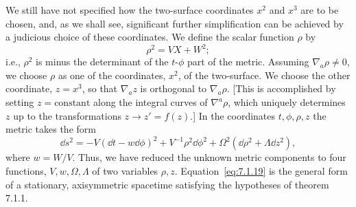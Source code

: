 We still have not specified how the two-surface coordinates \(x^2\) and \(x^3\) are
to be chosen, and, as we shall see, significant further simplification can be achieved
by a judicious choice of these coordinates. We define the scalar function \(\rho\) by
\begin{equation}
  \rho^2=VX+W^2 ;
  \tag{7.1.18}\label{eq:7.1.18}
\end{equation}
i.e., \(\rho^2\) is minus the determinant of the \(t\)-\(\phi\) part of the metric.
Assuming \(\nabla_a\rho\ne0\), we choose \(\rho\) as one of the coordinates,
\(x^2\), of the two-surface. We choose the other coordinate, \(z=x^3\), so that
\(\nabla_az\) is orthogonal to \(\nabla_a\rho\). [This is accomplished by setting
\(z=\text{constant}\) along the integral curves of \(\nabla^a\rho\), which uniquely
determines \(z\) up to the transformations \(z\longrightarrow z'=f(z)\).] In the
coordinates \(t,\phi,\rho,z\) the metric takes the form
\begin{equation}
  \dd s^2=-V(\dd t-w\dd\phi)^2+V^{-1}\rho^2\dd\phi^2
    +\Omega^2(\dd\rho^2+\Lambda\dd z^2) ,
  \tag{7.1.19}\label{eq:7.1.19}
\end{equation}
where \(w=W/V\). Thus, we have reduced the unknown metric components to four
functions, \(V,w,\Omega,\Lambda\) of two variables \(\rho,z\).
Equation~\eqref{eq:7.1.19} is the general form of a stationary, axisymmetric
spacetime satisfying the hypotheses of theorem 7.1.1.

